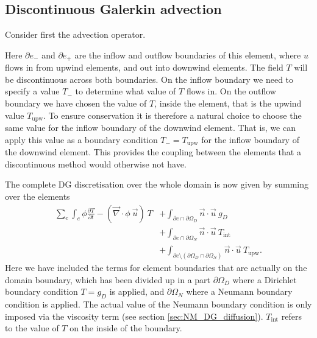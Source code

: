 \subsection{Discontinuous Galerkin advection}
\label{Sect:ND_discontinuous_galerkin_advection}

Consider first the advection operator. 

Here $\partial e_-$ and $\partial e_+$ are the inflow and outflow boundaries of this element, where
$u$ flows in from upwind elements, and out into downwind elements. The field $T$ will be 
discontinuous across both boundaries. On the inflow boundary we need 
to specify a value $T_-$ to determine what value of $T$ flows in. On the outflow boundary we have 
chosen the value of $T$, inside the element, that is the upwind value $T_{\mathrm{upw}}$.
To ensure conservation it is therefore a natural choice to choose the same value 
for the inflow boundary of the downwind element. That is, we can apply this value as a 
boundary condition $T_-=T_{\mathrm{upw}}$ for the inflow boundary of the downwind 
element. This provides the coupling between the elements that a discontinuous method would otherwise 
not have.

The complete DG discretisation over the whole domain is now given by summing over the elements
\begin{equation}
\begin{split}
  \sum_e \int_e \phi \frac{\partial T}{\partial t}
    - \left(\vec{\nabla}\cdot \phi~\vec{u}\right)~T 
    &+ \int_{\partial e \cap\partial\Omega_D} \vec{n}\cdot\vec{u}~g_D \\
    &+ \int_{\partial e \cap\partial\Omega_N} \vec{n}\cdot\vec{u}~T_{\mathrm{int}} \\
    &+ \int_{\partial e\setminus (\partial\Omega_D\cap\partial\Omega_N)} \vec{n}\cdot\vec{u}~T_{\mathrm{upw}}.
      \label{eq:dg_adv_diff_integrated_once}
\end{split}
\end{equation}
Here we have included the terms for element boundaries that are actually on
the domain boundary, which has been divided up in a part $\partial\Omega_D$
where a Dirichlet boundary condition $T=g_D$ is applied, and
$\partial\Omega_N$ where a Neumann boundary condition is applied. The actual value of
the Neumann boundary condition is only imposed via the viscosity term (see
section \ref{sec:NM_DG_diffusion}). $T_{\mathrm{int}}$ refers to the value of
$T$ on the inside of the boundary.

